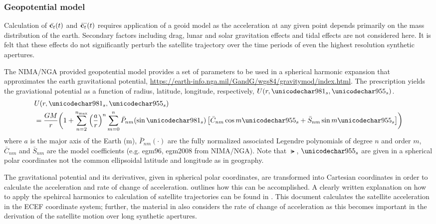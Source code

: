 \subsubsection{Geopotential model}
Calculation of $\ddot{\mathbf{c}_t}(t)$ and $\dddot{\mathbf{c}_t}(t)$ requires application of a geoid model as the acceleration at any given point depends primarily on the mass distribution of the earth. Secondary factors including drag, lunar and solar gravitation effects and tidal effects are not considered here. It is felt that these effects do not significantly perturb the satellite trajectory over the time periods of even the highest resolution synthetic apertures. 
\par
The NIMA/NGA provided geopotential model provides a set of parameters to be used in a spherical harmonic expansion that approximates the earth gravitational potential, \url{https://earth-info.nga.mil/GandG/wgs84/gravitymod/index.html}. The prescription yields the graviational potential as a function of radius, latitude, longitude, respectively, $U(r, \lat, \lng)$. 
\begin{equation}
\begin{split}
 &U(r, \lat, \lng)\\ &= \frac{GM}{r}\biggl(1+\sum_{n=2}^{n_{\text{max}}}\left(\frac{a}{r}\right)^n\sum_{m=0}^n\bar{P}_{nm}(\sin\lat)\left[\bar{C}_{nm}\cos{m\lng} + \bar{S}_{nm}\sin{m\lng}\right]\biggr)
\end{split}
\label{eq:egm96model}
\end{equation}
where $a$ is the major axis of the Earth (m), $\bar{P}_{nm}(\cdot)$ are the fully normalized associated Legendre polynomials of degree $n$ and order $m$, $\bar{C}_{nm}$ and $\bar{S}_{nm}$ are the model coefficients (e.g. egm96, egm2008 from NIMA/NGA). 
Note that $\lat$, $\lng$ are given in a spherical polar coordinates not the common ellipsoidal latitude and longitude as in geography. 
\par
The gravitational potential and its derivatives, given in spherical polar coordinates, are transformed into Cartesian coordinates in order to calculate the acceleration and rate of change of acceleration.  outlines how this can be accomplished. A clearly written explanation on how to apply the spehircal harmonics to calculation of satellite trajectories can be found in \cite{Shou2014}. This document calculates the satellite acceleration in the ECEF coordinate system; further, the material in  also considers the rate of change of acceleration as this becomes important in the derivation of the satellite motion over long synthetic apertures.
